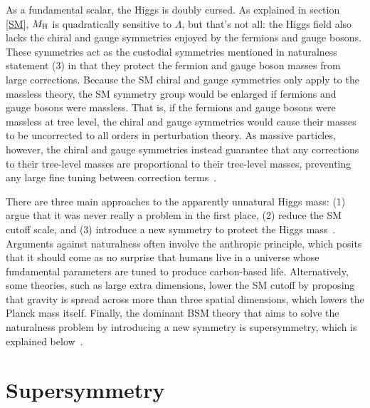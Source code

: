 \documentclass[12pt]{article}
\begin{document}
    As a fundamental scalar, the Higgs is doubly cursed. As explained in section \ref{SM}, $M_{\mathrm{H}}$ is quadratically sensitive to $\Lambda$, but that's not all: the Higgs field also lacks the chiral and gauge symmetries enjoyed by the fermions and gauge bosons. These symmetries act as the custodial symmetries mentioned in naturalness statement (3) in that they protect the fermion and gauge boson masses from large corrections. Because the SM chiral and gauge symmetries only apply to the massless theory, the SM symmetry group would be enlarged if fermions and gauge bosons were massless. That is, if the fermions and gauge bosons were massless at tree level, the chiral and gauge symmetries would cause their masses to be uncorrected to all orders in perturbation theory. As massive particles, however, the chiral and gauge symmetries instead guarantee that any corrections to their tree-level masses are proportional to their tree-level masses, preventing any large fine tuning between correction terms~\cite{giudice_naturally}.  

     There are three main approaches to the apparently unnatural Higgs mass: (1) argue that it was never really a problem in the first place, (2) reduce the SM cutoff scale, and (3) introduce a new symmetry to protect the Higgs mass~\cite{craig}. Arguments against naturalness often involve the anthropic principle, which posits that it should come as no surprise that humans live in a universe whose fundamental parameters are tuned to produce carbon-based life. Alternatively, some theories, such as large extra dimensions, lower the SM cutoff by proposing that gravity is spread across more than three spatial dimensions, which lowers the Planck mass itself. Finally, the dominant BSM theory that aims to solve the naturalness problem by introducing a new symmetry is supersymmetry, which is explained below~\cite{dine_naturalness}.
    
\section{Supersymmetry}
\end{document}
